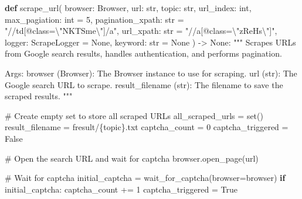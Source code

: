 \documentclass[
  titlepage]{article}
\newenvironment{Shaded}{\begin{snugshade}}{\end{snugshade}}
\newcommand{\BuiltInTok}[1]{\textcolor[rgb]{0.00,0.23,0.31}{#1}}
\newcommand{\CharTok}[1]{\textcolor[rgb]{0.13,0.47,0.30}{#1}}
\newcommand{\CommentTok}[1]{\textcolor[rgb]{0.37,0.37,0.37}{#1}}
\newcommand{\ControlFlowTok}[1]{\textcolor[rgb]{0.00,0.23,0.31}{\textbf{#1}}}
\newcommand{\DecValTok}[1]{\textcolor[rgb]{0.68,0.00,0.00}{#1}}
\newcommand{\KeywordTok}[1]{\textcolor[rgb]{0.00,0.23,0.31}{\textbf{#1}}}
\newcommand{\NormalTok}[1]{\textcolor[rgb]{0.00,0.23,0.31}{#1}}
\newcommand{\OperatorTok}[1]{\textcolor[rgb]{0.37,0.37,0.37}{#1}}
\newcommand{\SpecialCharTok}[1]{\textcolor[rgb]{0.37,0.37,0.37}{#1}}
\newcommand{\SpecialStringTok}[1]{\textcolor[rgb]{0.13,0.47,0.30}{#1}}
\newcommand{\StringTok}[1]{\textcolor[rgb]{0.13,0.47,0.30}{#1}}
\newcommand{\VariableTok}[1]{\textcolor[rgb]{0.07,0.07,0.07}{#1}}
\begin{document}
\begin{Shaded}
\begin{Highlighting}[]
\KeywordTok{def}\NormalTok{ scrape\_url(}
\NormalTok{        browser: Browser, }
\NormalTok{        url: }\BuiltInTok{str}\NormalTok{, }
\NormalTok{        topic: }\BuiltInTok{str}\NormalTok{, }
\NormalTok{        url\_index: }\BuiltInTok{int}\NormalTok{, }
\NormalTok{        max\_pagiation: }\BuiltInTok{int} \OperatorTok{=} \DecValTok{5}\NormalTok{, }
\NormalTok{        pagination\_xpath: }\BuiltInTok{str} \OperatorTok{=} \StringTok{"//td[@class=}\CharTok{\textbackslash{}"}\StringTok{NKTSme}\CharTok{\textbackslash{}"}\StringTok{]/a"}\NormalTok{, }
\NormalTok{        url\_xpath: }\BuiltInTok{str} \OperatorTok{=} \StringTok{"//a[@class=}\CharTok{\textbackslash{}"}\StringTok{zReHs}\CharTok{\textbackslash{}"}\StringTok{]"}\NormalTok{,}
\NormalTok{        logger: ScrapeLogger }\OperatorTok{=} \VariableTok{None}\NormalTok{,}
\NormalTok{        keyword: }\BuiltInTok{str} \OperatorTok{=} \VariableTok{None}
\NormalTok{        ) }\OperatorTok{{-}\textgreater{}} \VariableTok{None}\NormalTok{:}
    \CommentTok{"""}
\CommentTok{    Scrapes URLs from Google search results, handles authentication, and performs pagination.}

\CommentTok{    Args:}
\CommentTok{        browser (Browser): The Browser instance to use for scraping.}
\CommentTok{        url (str): The Google search URL to scrape.}
\CommentTok{        result\_filename (str): The filename to save the scraped results.}
\CommentTok{    """}
    
    \CommentTok{\# Create empty set to store all scraped URLs}
\NormalTok{    all\_scraped\_urls }\OperatorTok{=} \BuiltInTok{set}\NormalTok{()}
\NormalTok{    result\_filename }\OperatorTok{=} \SpecialStringTok{f\textquotesingle{}result/}\SpecialCharTok{\{}\NormalTok{topic}\SpecialCharTok{\}}\SpecialStringTok{.txt\textquotesingle{}}
\NormalTok{    captcha\_count }\OperatorTok{=} \DecValTok{0}
\NormalTok{    captcha\_triggered }\OperatorTok{=} \VariableTok{False}
    
    \CommentTok{\# Open the search URL and wait for captcha}
\NormalTok{    browser.open\_page(url)}

    \CommentTok{\# Wait for captcha}
\NormalTok{    initial\_captcha }\OperatorTok{=}\NormalTok{ wait\_for\_captcha(browser}\OperatorTok{=}\NormalTok{browser)}
    \ControlFlowTok{if}\NormalTok{ initial\_captcha:}
\NormalTok{            captcha\_count }\OperatorTok{+=} \DecValTok{1}
\NormalTok{            captcha\_triggered }\OperatorTok{=} \VariableTok{True}
    

\end{Highlighting}
\end{Shaded}
\end{document}
